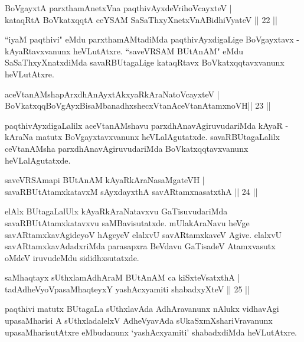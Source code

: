\begin{shl}
BoVgayxtA parxthamAnetxVna paqthivAyxdeVrihoVcayxteV |\\
kataqRtA BoVkatxqqtA ceYSAM SaSaThxyXnetxVnABidhiVyateV \hfill || 22 || 
\end{shl}
\begin{artha}
``iyaM paqthivi" eMdu parxthamAMtadiMda paqthivAyxdigaLige BoVgayxtavx - kAyaRtavxvanunx heVLutAtxre. ``saveVRSAM BUtAnAM" eMdu SaSaThxyXnatxdiMda savaRBUtagaLige kataqRtavx BoVkatxqqtavxvanunx heVLutAtxre.
\end{artha}
\begin{shl}
aceVtanAMshapArxdhAnAyxtAkxyaRkAraNatoVcayxteV |\\
BoVkatxqqBoVgAyxBisaMbanadhxshecxVtanAceVtanAtamxnoVH\hfill  || 23 || 
\end{shl}
\begin{artha}
paqthivAyxdigaLalilx aceVtanAMshavu parxdhAnavAgiruvudariMda kAyaR - kAraNa matutx BoVgayxtavxvanunx heVLalAgutatxde. savaRBUtagaLalilx ceVtanAMsha parxdhAna\-vAgiruvudariMda BoVkatxqqtavxvanunx heVLalAgutatxde.
\end{artha}
\begin{shl}
saveVRSAmapi BUtAnAM kAyaRkAraNasaMgateVH |\\
savaRBUtAtamxkatavxM sAyxdayxthA savARtamxnasatxthA \hfill || 24 ||
\end{shl}
\begin{artha}
elAlx BUtagaLalUlx kAyaRkAraNatavxvu GaTisuvudariMda savaRBUtAtamxkatavxvu saMBavisutatxde. mUlakAraNavu heVge savARtamxkavAgideyoV hAgeyeV elalxvU savARtamxkaveV Agive. elalxvU savARtamxkavAdadxriMda parasapxra BeVdavu GaTisadeV Atamxvasutx oMdeV iruvudeMdu sididhxsutatxde.  
\end{artha}
\begin{shl}
saMhaqtayx sUthxlamAdhAraM BUtAnAM ca kiSxteVsatxthA |\\
tadAdheVyoVpasaMhaqteyxY yashAcxyamiti shabadxyXteV \hfill || 25 || 
\end{shl}
\begin{artha}
paqthivi matutx BUtagaLa sUthxlavAda AdhAravanunx nAlukx vidhavAgi upasaMharisi A sUthxladalelxV AdheVyavAda sUkaSxmXshariVravanunx upasaMharisutAtxre eMbudanunx `yashAcxyamiti' shabadxdiMda heVLutAtxre.
\end{artha}

